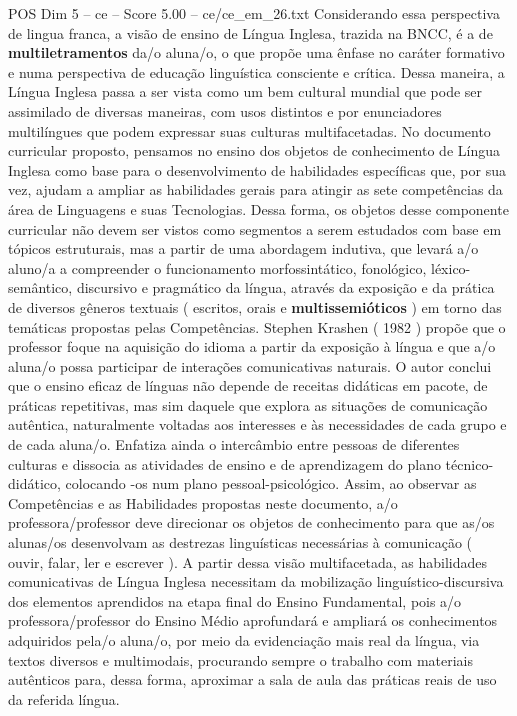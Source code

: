 \begin{textsample}{POS Dim 5 – ce – Score 5.00 – ce/ce\_em\_26.txt}
Considerando essa perspectiva de lingua franca, a visão de ensino de Língua Inglesa, trazida na BNCC, é a de \textbf{multiletramentos} da/o aluna/o, o que propõe uma ênfase no caráter formativo e numa perspectiva de educação linguística consciente e crítica.
Dessa maneira, a Língua Inglesa passa a ser vista como um bem cultural mundial que pode ser assimilado de diversas maneiras, com usos distintos e por enunciadores multilíngues que podem expressar suas culturas multifacetadas.
No documento curricular proposto, pensamos no ensino dos objetos de conhecimento de Língua Inglesa como base para o desenvolvimento de habilidades específicas que, por sua vez, ajudam a ampliar as habilidades gerais para atingir as sete competências da área de Linguagens e suas Tecnologias.
Dessa forma, os objetos desse componente curricular não devem ser vistos como segmentos a serem estudados com base em tópicos estruturais, mas a partir de uma abordagem indutiva, que levará a/o aluno/a a compreender o funcionamento morfossintático, fonológico, léxico-semântico, discursivo e pragmático da língua, através da exposição e da prática de diversos gêneros textuais ( escritos, orais e \textbf{multissemióticos} ) em torno das temáticas propostas pelas Competências.
Stephen Krashen ( 1982 ) propõe que o professor foque na aquisição do idioma a partir da exposição à língua e que a/o aluna/o possa participar de interações comunicativas naturais.
O autor conclui que o ensino eficaz de línguas não depende de receitas didáticas em pacote, de práticas repetitivas, mas sim daquele que explora as situações de comunicação autêntica, naturalmente voltadas aos interesses e às necessidades de cada grupo e de cada aluna/o.
Enfatiza ainda o intercâmbio entre pessoas de diferentes culturas e dissocia as atividades de ensino e de aprendizagem do plano técnico-didático, colocando -os num plano pessoal-psicológico.
Assim, ao observar as Competências e as Habilidades propostas neste documento, a/o professora/professor deve direcionar os objetos de conhecimento para que as/os alunas/os desenvolvam as destrezas linguísticas necessárias à comunicação ( ouvir, falar, ler e escrever ).
A partir dessa visão multifacetada, as habilidades comunicativas de Língua Inglesa necessitam da mobilização linguístico-discursiva dos elementos aprendidos na etapa final do Ensino Fundamental, pois a/o professora/professor do Ensino Médio aprofundará e ampliará os conhecimentos adquiridos pela/o aluna/o, por meio da evidenciação mais real da língua, via textos diversos e multimodais, procurando sempre o trabalho com materiais autênticos para, dessa forma, aproximar a sala de aula das práticas reais de uso da referida língua.

\end{textsample}
